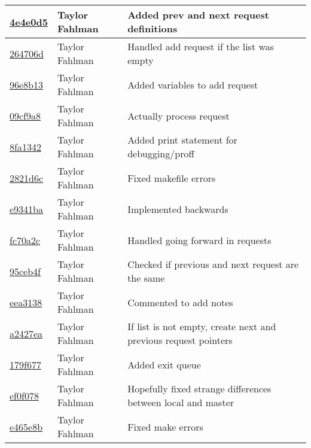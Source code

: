 \begin{tabular}{l l l}
\href{git@github.com:fahlmant/cs444/commit/4e4e0d50bb79cb0287dd9e15bf858950aca4e52c}{4e4e0d5} & Taylor Fahlman & Added prev and next request definitions\\\hline
\href{git@github.com:fahlmant/cs444/commit/264706d970dd72869b019450b1f75bc089303f51}{264706d} & Taylor Fahlman & Handled add request if the list was empty\\\hline
\href{git@github.com:fahlmant/cs444/commit/96e8b1364367fb70321afbf63863220dec0966bb}{96e8b13} & Taylor Fahlman & Added variables to add request\\\hline
\href{git@github.com:fahlmant/cs444/commit/09cf9a81142f457cc824439568eb4f7d0202b485}{09cf9a8} & Taylor Fahlman & Actually process request\\\hline
\href{git@github.com:fahlmant/cs444/commit/8fa13421d3f213f3e1698235bd37426b314838d6}{8fa1342} & Taylor Fahlman & Added print statement for debugging/proff\\\hline
\href{git@github.com:fahlmant/cs444/commit/2821d6ce67d5d1a5051838079defe48c4f14ee9f}{2821d6c} & Taylor Fahlman & Fixed makefile errors\\\hline
\href{git@github.com:fahlmant/cs444/commit/e9341bad2ae0d815c1eddedcb0070bb99c3ae231}{e9341ba} & Taylor Fahlman & Implemented backwards\\\hline
\href{git@github.com:fahlmant/cs444/commit/fc70a2c72e4933dbf271bf6f5b4adc250cd93f0b}{fc70a2c} & Taylor Fahlman & Handled going forward in requests\\\hline
\href{git@github.com:fahlmant/cs444/commit/95ceb4f9438107951331d241099b020416a2e580}{95ceb4f} & Taylor Fahlman & Checked if previous and next request are the same\\\hline
\href{git@github.com:fahlmant/cs444/commit/eea31387ddd4b439198607910a6025a957d4ce2b}{eea3138} & Taylor Fahlman & Commented to add notes\\\hline
\href{git@github.com:fahlmant/cs444/commit/a2427eaa94cfc72c3c636d359e1ff18729c50803}{a2427ea} & Taylor Fahlman & If list is not empty, create next and previous request pointers\\\hline
\href{git@github.com:fahlmant/cs444/commit/179f677a63ce6e59233d66e1696cc2a2c6da4f94}{179f677} & Taylor Fahlman & Added exit queue\\\hline
\href{git@github.com:fahlmant/cs444/commit/ef0f078626f6b3779db8239cfadefc9b0eb57422}{ef0f078} & Taylor Fahlman & Hopefully fixed strange differences between local and master\\\hline
\href{git@github.com:fahlmant/cs444/commit/e465e8bca4a176e46eec39c9506fcbbeaa52346d}{e465e8b} & Taylor Fahlman & Fixed make errors\\\hline

\end{tabular}
